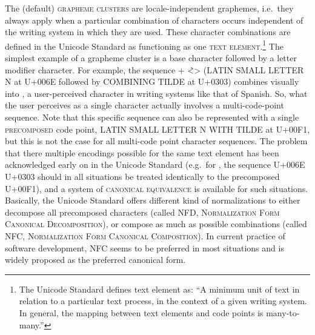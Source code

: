 The (default) \textsc{grapheme clusters} are locale-independent graphemes,
i.e.~they always apply when a particular combination of characters occurs
independent of the writing system in which they are used. These character
combinations are defined in the Unicode Standard as functioning as one
\textsc{text element}.\footnote{The Unicode Standard defines text element as:
``A minimum unit of text in relation to a particular text process, in the
context of a given writing system. In general, the mapping between text elements
and code points is many-to-many.''} The simplest example of a grapheme cluster
is a base character followed by a letter modifier character. For example, the
sequence + <̃\textgreater{} (LATIN SMALL LETTER N at U+006E followed by
COMBINING TILDE at U+0303) combines visually into , a user-perceived character
in writing systems like that of Spanish. So, what the user perceives as a single
character actually involves a multi-code-point sequence. Note that this specific
sequence can also be represented with a single \textsc{precomposed} code point,
LATIN SMALL LETTER N WITH TILDE at U+00F1, but this is not the case for all
multi-code point character sequences. The problem that there multiple encodings
possible for the same text element has been acknowledged early on in the Unicode
Standard (e.g.~for , the sequence U+006E U+0303 should in all situations be
treated identically to the precomposed U+00F1), and a system of
\textsc{canonical equivalence} is available for such situations. Basically, the
Unicode Standard offers different kind of normalizations to either decompose all
precomposed characters (called \textsc{NFD}, \textsc{Normalization Form
Canonical Decomposition}), or compose as much as possible combinations (called
\textsc{NFC}, \textsc{Normalization Form Canonical Composition}). In current
practice of software development, NFC seems to be preferred in most situations
and is widely proposed as the preferred canonical form.

